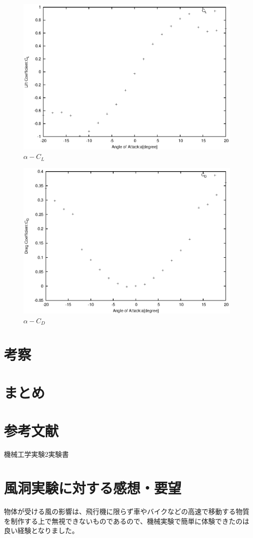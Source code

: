 \documentclass[a4j,twoside,openright,11pt]{jarticle}
\begin{document}
\begin{figure}[htbp]
\begin{center}
\includegraphics[width=12cm]{./2-CL-CD/CL-CD.eps}
\end{center}
\caption{$\alpha-C_L$}
\end{figure}

\begin{figure}[htbp]
\begin{center}
\includegraphics[width=12cm]{./2-CL-CD/CD.eps}
\end{center}
\caption{$\alpha-C_D$}
\end{figure}

\newpage
\section{考察}
\section{まとめ}
\section{参考文献}
機械工学実験2実験書
\section{風洞実験に対する感想・要望}
物体が受ける風の影響は、飛行機に限らず車やバイクなどの高速で移動する物質を制作する上で無視できないものであるので、機械実験で簡単に体験できたのは良い経験となりました。
\end{document}
